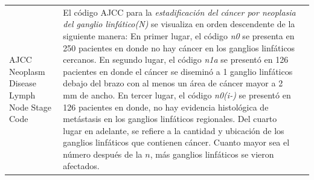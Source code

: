 \begin{table}[!htb]
	\footnotesize
	\begin{threeparttable}
		\begin{tabular}{p{2.5cm} p{7cm} p{6.5cm}} \toprule
			AJCC Neoplasm Disease Lymph Node Stage Code
			& El código AJCC para la \textit{estadificación del cáncer por neoplasia del ganglio linfático(N)} se visualiza en orden descendente de la siguiente manera: En primer lugar, el código \textit{n0} se presenta en 250 pacientes en donde no hay cáncer en los ganglios linfáticos cercanos. En segundo lugar, el código \textit{n1a} se presentó en 126 pacientes en donde el cáncer se diseminó a 1 ganglio linfáticos debajo del brazo con al menos un área de cáncer mayor a 2 mm de ancho. En tercer lugar, el código \textit{n0(i-)} se presentó en 126 pacientes en donde, no hay evidencia histológica de metástasis en los ganglios linfáticos regionales. Del cuarto lugar en adelante, se refiere a la cantidad y ubicación de los ganglios linfáticos que contienen cáncer. Cuanto mayor sea el número después de la $n$, más ganglios linfáticos se vieron afectados.	
			

\end{tabular}
\end{threeparttable}
\end{table}
